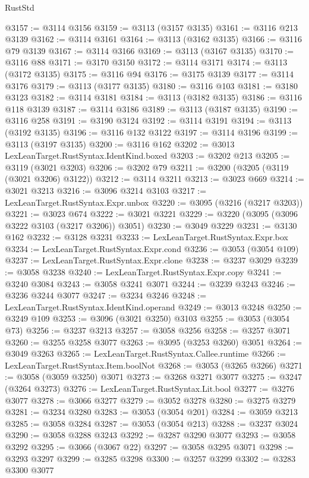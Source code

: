 \begin{lexlean}{RustStd}
\begin{coremodule}
@3157 := @3114 @3156
@3159 := @3113 (@3157 @3135)
@3161 := @3116 @213 @3139
@3162 := @3114 @3161
@3164 := @3113 (@3162 @3135)
@3166 := @3116 @79 @3139
@3167 := @3114 @3166
@3169 := @3113 (@3167 @3135)
@3170 := @3116 @88
@3171 := @3170 @3150
@3172 := @3114 @3171
@3174 := @3113 (@3172 @3135)
@3175 := @3116 @94
@3176 := @3175 @3139
@3177 := @3114 @3176
@3179 := @3113 (@3177 @3135)
@3180 := @3116 @103
@3181 := @3180 @3123
@3182 := @3114 @3181
@3184 := @3113 (@3182 @3135)
@3186 := @3116 @118 @3139
@3187 := @3114 @3186
@3189 := @3113 (@3187 @3135)
@3190 := @3116 @258
@3191 := @3190 @3124
@3192 := @3114 @3191
@3194 := @3113 (@3192 @3135)
@3196 := @3116 @132 @3122
@3197 := @3114 @3196
@3199 := @3113 (@3197 @3135)
@3200 := @3116 @162
@3202 := @3013 LexLeanTarget.RustSyntax.IdentKind.boxed
@3203 := @3202 @213
@3205 := @3119 (@3021 @3203)
@3206 := @3202 @79
@3211 := @3200 (@3205 (@3119 (@3021 @3206) @3122))
@3212 := @3114 @3211
@3213 := @3023 @669
@3214 := @3021 @3213
@3216 := @3096 @3214 @3103
@3217 := LexLeanTarget.RustSyntax.Expr.unbox
@3220 := @3095 (@3216 (@3217 @3203))
@3221 := @3023 @674
@3222 := @3021 @3221
@3229 := @3220 (@3095 (@3096 @3222 @3103 (@3217 @3206)) @3051)
@3230 := @3049 @3229
@3231 := @3130 @162
@3232 := @3128 @3231
@3233 := LexLeanTarget.RustSyntax.Expr.box
@3234 := LexLeanTarget.RustSyntax.Expr.cond
@3236 := @3053 (@3054 @109)
@3237 := LexLeanTarget.RustSyntax.Expr.clone
@3238 := @3237 @3029
@3239 := @3058 @3238
@3240 := LexLeanTarget.RustSyntax.Expr.copy
@3241 := @3240 @3084
@3243 := @3058 @3241 @3071
@3244 := @3239 @3243
@3246 := @3236 @3244 @3077
@3247 := @3234 @3246
@3248 := LexLeanTarget.RustSyntax.IdentKind.operand
@3249 := @3013 @3248
@3250 := @3249 @109
@3253 := @3096 (@3021 @3250) @3103
@3255 := @3053 (@3054 @73)
@3256 := @3237 @3213
@3257 := @3058 @3256
@3258 := @3257 @3071
@3260 := @3255 @3258 @3077
@3263 := @3095 (@3253 @3260) @3051
@3264 := @3049 @3263
@3265 := LexLeanTarget.RustSyntax.Callee.runtime
@3266 := LexLeanTarget.RustSyntax.Item.boolNot
@3268 := @3053 (@3265 @3266)
@3271 := @3058 (@3059 @3250) @3071
@3273 := @3268 @3271 @3077
@3275 := @3247 (@3264 @3273)
@3276 := LexLeanTarget.RustSyntax.Lit.bool
@3277 := @3276 @3077
@3278 := @3066 @3277
@3279 := @3052 @3278
@3280 := @3275 @3279
@3281 := @3234 @3280
@3283 := @3053 (@3054 @201)
@3284 := @3059 @3213
@3285 := @3058 @3284
@3287 := @3053 (@3054 @213)
@3288 := @3237 @3024
@3290 := @3058 @3288 @3243
@3292 := @3287 @3290 @3077
@3293 := @3058 @3292
@3295 := @3066 (@3067 @22)
@3297 := @3058 @3295 @3071
@3298 := @3293 @3297
@3299 := @3285 @3298
@3300 := @3257 @3299
@3302 := @3283 @3300 @3077

\end{coremodule}
\end{lexlean}
